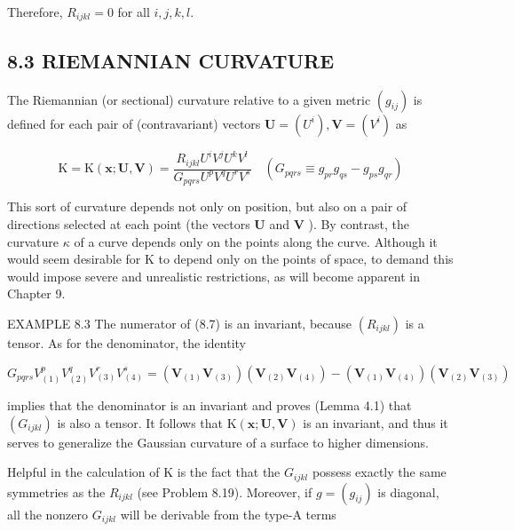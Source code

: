 \documentclass[10pt]{article}
\begin{document}
Therefore, $R_{i j k l}=0$ for all $i, j, k, l$.

\subsection*{8.3 RIEMANNIAN CURVATURE}
The Riemannian (or sectional) curvature relative to a given metric $\left(g_{i j}\right)$ is defined for each pair of (contravariant) vectors $\mathbf{U}=\left(U^{i}\right), \mathbf{V}=\left(V^{i}\right)$ as


\begin{equation*}
\mathrm{K}=\mathrm{K}(\mathbf{x} ; \mathbf{U}, \mathbf{V})=\frac{R_{i j k l} U^{i} V^{j} U^{k} V^{l}}{G_{p q r s} U^{p} V^{q} U^{r} V^{s}} \quad\left(G_{p q r s} \equiv g_{p r} g_{q s}-g_{p s} g_{q r}\right) \tag{8.7}
\end{equation*}


This sort of curvature depends not only on position, but also on a pair of directions selected at each point (the vectors $\mathbf{U}$ and $\mathbf{V}$ ). By contrast, the curvature $\kappa$ of a curve depends only on the points along the curve. Although it would seem desirable for $\mathrm{K}$ to depend only on the points of space, to demand this would impose severe and unrealistic restrictions, as will become apparent in Chapter 9.

EXAMPLE 8.3 The numerator of (8.7) is an invariant, because $\left(R_{i j k l}\right)$ is a tensor. As for the denominator, the identity


\begin{equation*}
G_{p q r s} V_{(1)}^{p} V_{(2)}^{q} V_{(3)}^{r} V_{(4)}^{s}=\left(\mathbf{V}_{(1)} \mathbf{V}_{(3)}\right)\left(\mathbf{V}_{(2)} \mathbf{V}_{(4)}\right)-\left(\mathbf{V}_{(1)} \mathbf{V}_{(4)}\right)\left(\mathbf{V}_{(2)} \mathbf{V}_{(3)}\right) \tag{8.8}
\end{equation*}


implies that the denominator is an invariant and proves (Lemma 4.1) that $\left(G_{i j k l}\right)$ is also a tensor. It follows that $\mathrm{K}(\mathbf{x} ; \mathbf{U}, \mathbf{V})$ is an invariant, and thus it serves to generalize the Gaussian curvature of a surface to higher dimensions.

Helpful in the calculation of $\mathrm{K}$ is the fact that the $G_{i j k l}$ possess exactly the same symmetries as the $R_{i j k l}$ (see Problem 8.19). Moreover, if $g=\left(g_{i j}\right)$ is diagonal, all the nonzero $G_{i j k l}$ will be derivable from the type-A terms
\end{document}
